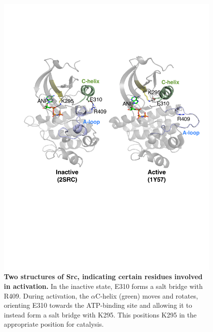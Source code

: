 \documentclass[aps,pre,twocolumn,nofootinbib,superscriptaddress,linenumbers]{revtex4-1}
\begin{document}

\begin{figure}[tb]
    \includegraphics[width=1.0\textwidth]{residue_pair_distances/src/src_ref_structures}
    
    \caption{{\bf Two structures of Src, indicating certain residues involved in activation.}
    In the inactive state, E310 forms a salt bridge with R409.
    During activation, the $\alpha$C-helix (green) moves and rotates, orienting E310 towards the ATP-binding site and allowing it to instead form a salt bridge with K295.
    This positions K295 in the appropriate position for catalysis.
  }
  \label{figure:src-ref-structures}
\end{figure}

\end{document}

